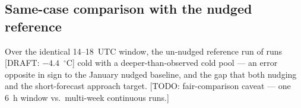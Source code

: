 \documentclass[air,article,submit,pdftex,moreauthors]{Definitions/mdpi}
\begin{document}
\subsection{Same-case comparison with the nudged reference}
Over the identical 14--18~UTC window, the un-nudged reference run of
\citet{tran2018} runs [DRAFT: $-4.4$~$^{\circ}$C] cold with a
deeper-than-observed cold pool --- an error opposite in sign to the January
nudged baseline, and the gap that both nudging and the short-forecast approach
target.
[TODO: fair-comparison caveat --- one 6~h window vs.\ multi-week continuous runs.]





\end{document}
